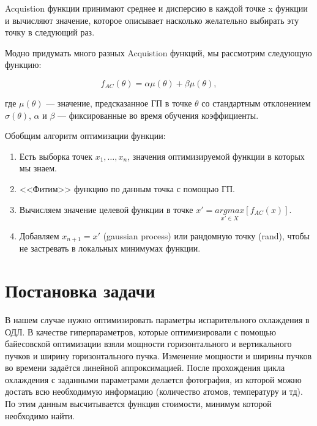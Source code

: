 \documentclass[a4paper,14pt]{extarticle}
\begin{document}
		Acquistion функции принимают среднее и дисперсию в каждой точке x функции и вычисляют значение, которое описывает насколько желательно выбирать эту точку в следующий раз. 
		
		Модно придумать много разных Acquistion функций, мы рассмотрим следующую функцию: 
		
		$$f_{AC}(\theta) = \alpha\mu(\theta) + \beta \mu(\theta),$$
		
		где $\mu(\theta)$ --- значение, предсказанное ГП в точке $\theta$ со стандартным отклонением $\sigma(\theta)$, $\alpha$ и $\beta$ --- фиксированные во время обучения коэффициенты. 
		
		
		Обобщим алгоритм оптимизации функции: 
		\begin{enumerate}
			\item Есть выборка точек $x_1, \ldots, x_n$, значения оптимизируемой функции в которых мы знаем.
			\item <<Фитим>> функцию по данным точка с помощью ГП. 
			\item Вычисляем значение целевой функции в точке $ x' = \underset{x' \in X}{argmax}[f_{AC}(x)].$
			\item Добавляем $x_{n+1} = x'$ (gaussian process) или рандомную точку (rand), чтобы не застревать в локальных минимумах функции.
		\end{enumerate}
		
		\section{Постановка задачи}
		
		В нашем случае нужно оптимизировать параметры испарительного охлаждения в ОДЛ. В качестве гиперпараметров, которые оптимизировали с помощью байесовской оптимизации взяли мощности горизонтального и вертикального пучков и ширину горизонтального пучка. Изменение мощности и ширины пучков во времени задаётся линейной аппроксимацией. После прохождения цикла охлаждения с заданными параметрами делается фотография, из которой можно достать всю необходимую информацию (количество атомов, температуру и тд). По этим данным высчитывается функция стоимости, минимум которой необходимо найти.
		
		
		
		
	
		
		
\end{document}
